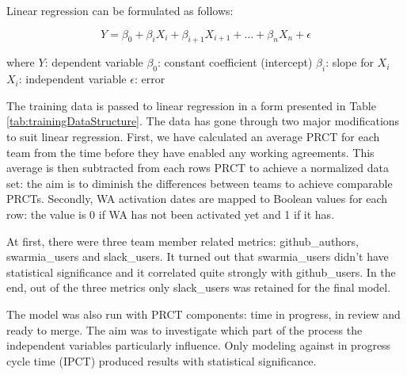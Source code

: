 Linear regression can be formulated as follows:

\begin{equation}
Y = \beta_0 + \beta_i X_i + \beta_{i+1} X_{i+1} + \ldots + \beta_n X_n + \epsilon
\end{equation}

where \newline
$Y$: dependent variable \newline
$\beta_0$: constant coefficient (intercept) \newline
$\beta_i$: slope for $X_i$ \newline
$X_i$: independent variable \newline
$\epsilon$: error \newline \newline

The training data is passed to linear regression in a form presented in Table \ref{tab:trainingDataStructure}. The data has gone through two major modifications to suit linear regression. First, we have calculated an average PRCT for each team from the time before they have enabled any working agreements. This average is then subtracted from each rows PRCT to achieve a normalized data set: the aim is to diminish the differences between teams to achieve comparable PRCTs. Secondly, WA activation dates are mapped to Boolean values for each row: the value is 0 if WA has not been activated yet and 1 if it has.

At first, there were three team member related metrics: github\_authors, swarmia\_users and slack\_users. It turned out that swarmia\_users didn't have statistical significance and it correlated quite strongly with github\_users. In the end, out of the three metrics only slack\_users was retained for the final model.

The model was also run with PRCT components: time in progress, in review and ready to merge. The aim was to investigate which part of the process the independent variables particularly influence. Only modeling against in progress cycle time (IPCT) produced results with statistical significance.  







